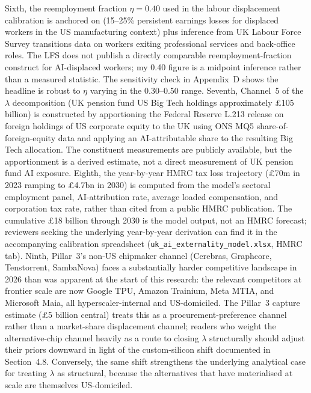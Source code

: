 \documentclass[11pt,letterpaper]{article}
\theoremstyle{remark}
\begin{document}
Sixth, the reemployment fraction $\eta = 0.40$ used in the labour displacement calibration is anchored on \citet{jacobson_lalonde_sullivan_1993} (15--25\% persistent earnings losses for displaced workers in the {US} manufacturing context) plus inference from {UK} Labour Force Survey transitions data on workers exiting professional services and back-office roles. The {LFS} does not publish a directly comparable reemployment-fraction construct for {AI}-displaced workers; my 0.40 figure is a midpoint inference rather than a measured statistic. The sensitivity check in Appendix~D shows the headline is robust to $\eta$ varying in the 0.30--0.50 range. Seventh, Channel~5 of the $\lambda$ decomposition (UK pension fund US Big Tech holdings approximately \pounds105 billion) is constructed by apportioning the Federal Reserve L.213 release on foreign holdings of US corporate equity to the UK using ONS MQ5 share-of-foreign-equity data and applying an AI-attributable share to the resulting Big Tech allocation. The constituent measurements are publicly available, but the apportionment is a derived estimate, not a direct measurement of UK pension fund AI exposure. Eighth, the year-by-year HMRC tax loss trajectory (\pounds70m in 2023 ramping to \pounds4.7bn in 2030) is computed from the model's sectoral employment panel, AI-attribution rate, average loaded compensation, and corporation tax rate, rather than cited from a public HMRC publication. The cumulative \pounds18 billion through 2030 is the model output, not an HMRC forecast; reviewers seeking the underlying year-by-year derivation can find it in the accompanying calibration spreadsheet (\texttt{uk\_ai\_externality\_model.xlsx}, HMRC tab). Ninth, Pillar~3's non-{US} chipmaker channel (Cerebras, Graphcore, Tenstorrent, {SambaNova}) faces a substantially harder competitive landscape in 2026 than was apparent at the start of this research: the relevant competitors at frontier scale are now Google {TPU}, Amazon Trainium, Meta {MTIA}, and Microsoft Maia, all hyperscaler-internal and {US}-domiciled. The Pillar~3 capture estimate (\pounds5 billion central) treats this as a procurement-preference channel rather than a market-share displacement channel; readers who weight the alternative-chip channel heavily as a route to closing $\lambda$ structurally should adjust their priors downward in light of the custom-silicon shift documented in Section~4.8. Conversely, the same shift strengthens the underlying analytical case for treating $\lambda$ as structural, because the alternatives that have materialised at scale are themselves {US}-domiciled.
\end{document}
